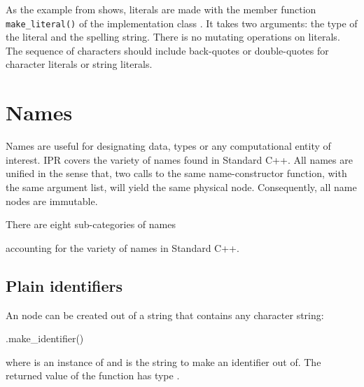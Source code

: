 \documentclass[11pt]{article}
\begin{document}
As the example from  shows, literals are made with
the member function \texttt{make\_literal()} of the implementation class
.  It takes two arguments:  the type of the literal and
the spelling string.  There is no mutating operations on literals.  The
sequence of characters should include back-quotes or double-quotes for
character literals or string literals. 

\section{Names}
\label{sec:name}

Names are useful for designating data, types or any computational entity of
interest. IPR covers the variety of names found in Standard C++.
All names are unified in the sense that, two calls to the same
name-constructor function, with the same argument list, will yield the same
physical node. Consequently, all name nodes are immutable.

There are eight sub-categories of names
\begin{Grammar}
\end{Grammar}
accounting for the variety of names in Standard C++.

\subsection{Plain identifiers}
\label{sec:name.identifier}

\begin{Grammar}
      
      
\end{Grammar}
An  node can be created out of a string that contains
any character string:
\begin{Program}
  .make_identifier()
\end{Program}
where  is an instance of  and  is
the string to make an identifier out of.  The returned value of the
function  has type .
\end{document}
